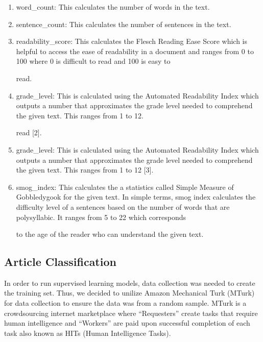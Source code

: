 \documentclass[10pt,letterpaper]{article}
\providecommand{\tightlist}{%
  \setlength{\itemsep}{0pt}\setlength{\parskip}{0pt}}
\begin{document}
\begin{enumerate}
\def\labelenumi{\arabic{enumi}.}
\tightlist
\item
  word\_count: This calculates the number of words in the text.
\item
  sentence\_count: This calculates the number of sentences in the text.
\item
  readability\_score: This calculates the Flesch Reading Ease Score
  which is helpful to access the ease of readability in a document and
  ranges from 0 to 100 where 0 is difficult to read and 100 is easy to

  read.
\item
  grade\_level: This is calculated using the Automated Readability Index
  which outputs a number that approximates the grade level needed to
  comprehend the given text. This ranges from 1 to 12.

  read {[}2{]}.
\item
  grade\_level: This is calculated using the Automated Readability Index
  which outputs a number that approximates the grade level needed to
  comprehend the given text. This ranges from 1 to 12 {[}3{]}.

\item
  smog\_index: This calculates the a statistics called Simple Measure of
  Gobbledygook for the given text. In simple terms, smog index
  calculates the difficulty level of a sentences based on the number of
  words that are polysyllabic. It ranges from 5 to 22 which corresponds

  to the age of the reader who can understand the given text.
\end{enumerate}

\subsection{Article Classification}\label{article-classification}

In order to run supervised learning models, data collection was needed
to create the training set. Thus, we decided to unilize Amazon
Mechanical Turk (MTurk) for data collection to ensure the data was from
a random sample. MTurk is a crowdsourcing internet marketplace where
``Requesters'' create tasks that require human intelligence and
``Workers'' are paid upon successful completion of each task also known
as HITs (Human Intelligence Tasks).
\end{document}
